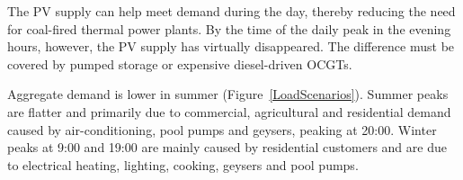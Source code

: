 The \ac{PV} supply can help meet demand during the day, thereby reducing the need for coal-fired thermal power plants. By the time of the daily peak in the evening hours, however, the \ac{PV} supply has virtually disappeared. The difference must be covered by pumped storage or expensive diesel-driven \ac{OCGTs}.




Aggregate demand is lower in summer (Figure~\ref{LoadScenarios}). Summer peaks are flatter and primarily due to commercial, agricultural and residential demand caused by air-conditioning, pool pumps and geysers, peaking at 20:00. Winter peaks at 9:00 and 19:00 are mainly caused by residential customers and are due to electrical heating, lighting, cooking, geysers and pool pumps.

